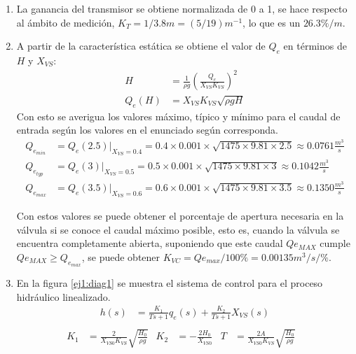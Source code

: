 \begin{ejercicio}

  \begin{enumerate}
    \item %
    La ganancia del transmisor se obtiene normalizada de 0 a 1, se hace respecto al ámbito de medición, $K_T = 1/3.8m = (5/19)m^{-1}$, lo que es un $26.3\%/m$.

    \item %
    A partir de la característica estática se obtiene el valor de $Q_e$ en términos de $H$ y $X_{VS}$:
    \begin{align*}
    \tag{Característica Estática}
    H &=\frac{1}{\rho g} \left( \frac{Q_e}{X_{VS}K_{VS}} \right)^2
    \\
    Q_e(H) &= X_{VS} K_{VS}\sqrt{\rho g H}
    \end{align*}
    Con esto se averigua los valores máximo, típico y mínimo para el caudal de entrada según los valores en el enunciado según corresponda.
    \begin{align*}
    Q_{e_{min}} &= Q_{e}(2.5)|_{X_{VS}=0.4} = 0.4 \times 0.001 \times \sqrt{1475\times9.81\times2.5} \approx 0.0761 \frac{m^3}{s}
    \\
    Q_{e_{typ}} &= Q_{e}(3)|_{X_{VS}=0.5} = 0.5 \times 0.001 \times \sqrt{1475\times9.81\times3} \approx 0.1042 \frac{m^3}{s}
    \\
    Q_{e_{max}} &= Q_{e}(3.5)|_{X_{VS}=0.6} = 0.6 \times 0.001 \times \sqrt{1475\times9.81\times3.5} \approx 0.1350 \frac{m^3}{s}
    \end{align*}

    Con estos valores se puede obtener el porcentaje de apertura necesaria en la válvula si se conoce el caudal máximo posible, esto es, cuando la válvula se encuentra completamente abierta, suponiendo que este caudal $Q{e_{MAX}}$ cumple $Q{e_{MAX}} \geq Q_{e_{max}}$, se puede obtener $K_{VC}=Q{e_{max}}/100\%=0.00135m^3/s/\%$.

    \item %
    En la figura \ref{ej1:diag1} se muestra el sistema de control para el proceso hidráulico linealizado.
    \begin{align*}
      \tag{Modelo linealizado}
      h(s) &= \frac{K_1}{Ts + 1}q_e(s) + \frac{K_2}{Ts + 1}X_{VS}(s)\\
    \end{align*}
    \begin{align*}
      K_1 &= \frac{2}{X_{VS0} K_{VS}}\sqrt{\frac{H_0}{\rho g}} &
      K_2 &= -\frac{2H_0}{X_{VS0}} &
      T &= \frac{2A}{X_{VS0} K_{VS}}\sqrt{\frac{H_0}{\rho g}} &
    \end{align*}




\end{enumerate}
\end{ejercicio}
